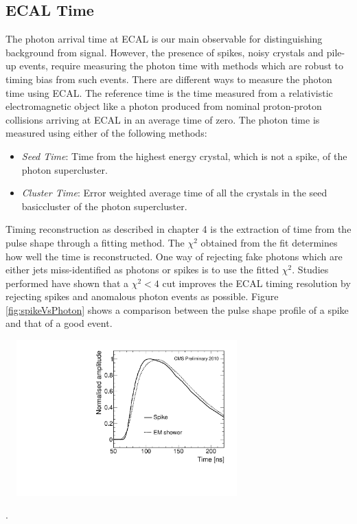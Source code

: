 \subsection{ECAL Time}
The photon arrival time at ECAL is our main observable for distinguishing background from signal.  However, the presence of spikes, noisy crystals and pile-up events, require measuring the photon time with methods which are robust to timing bias from such events.
There are different ways to measure the photon time using ECAL.  The reference time is the time measured from a relativistic electromagnetic object like a photon produced from nominal proton-proton collisions arriving at ECAL in an average time of zero. The photon time is measured using either of the following methods: 
\begin{itemize}
\item \textit{Seed Time}: Time from the highest energy crystal, which is not a spike, of the photon supercluster.
\item \textit{Cluster Time}: Error weighted average time of all the crystals in the seed basiccluster of the photon supercluster.
\end{itemize} 

Timing reconstruction as described in chapter 4 is the extraction of time from the pulse shape through a fitting method. The $\chi^{2}$ obtained from the fit determines how well the time is reconstructed. One way of rejecting fake photons which are either jets miss-identified as photons or spikes is to use the fitted $\chi^{2}$. Studies performed have shown that a  $\chi^{2} < 4 $ cut improves the ECAL timing resolution by rejecting  spikes and anomalous photon events as possible. Figure \ref{fig:spikeVsPhoton} shows a comparison between the pulse shape profile of a spike and that of a good event.

\begin{center}
\centering
\includegraphics[height=6cm, width=0.7\textwidth]{THESISPLOTS/spike_pulse_shape.pdf}
\label{fig:spikeVsPhoton}
\end{center}.

